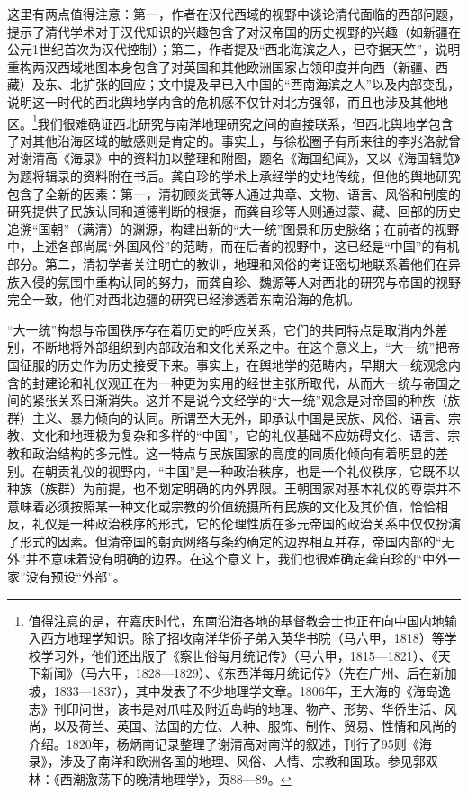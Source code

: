 \documentclass[a4paper, 12pt, openright]{ctexbook}
\begin{document}
这里有两点值得注意：第一，作者在汉代西域的视野中谈论清代面临的西部问题，提示了清代学术对于汉代知识的兴趣包含了对汉帝国的历史视野的兴趣（如新疆在公元1世纪首次为汉代控制）；第二，作者提及“西北海滨之人，已夺据天竺”，说明重构两汉西域地图本身包含了对英国和其他欧洲国家占领印度并向西（新疆、西藏）及东、北扩张的回应；文中提及早已入中国的“西南海滨之人”以及内部变乱，说明这一时代的西北舆地学内含的危机感不仅针对北方强邻，而且也涉及其他地区。\footnote{值得注意的是，在嘉庆时代，东南沿海各地的基督教会士也正在向中国内地输入西方地理学知识。除了招收南洋华侨子弟入英华书院（马六甲，1818）等学校学习外，他们还出版了《察世俗每月统记传》（马六甲，1815—1821）、《天下新闻》（马六甲，1828—1829）、《东西洋每月统记传》（先在广州、后在新加坡，1833—1837），其中发表了不少地理学文章。1806年，王大海的《海岛逸志》刊印问世，该书是对爪哇及附近岛屿的地理、物产、形势、华侨生活、风尚，以及荷兰、英国、法国的方位、人种、服饰、制作、贸易、性情和风尚的介绍。1820年，杨炳南记录整理了谢清高对南洋的叙述，刊行了95则《海录》，涉及了南洋和欧洲各国的地理、风俗、人情、宗教和国政。参见郭双林：《西潮激荡下的晚清地理学》，页88—89。}我们很难确证西北研究与南洋地理研究之间的直接联系，但西北舆地学包含了对其他沿海区域的敏感则是肯定的。事实上，与徐松圈子有所来往的李兆洛就曾对谢清高《海录》中的资料加以整理和附图，题名《海国纪闻》，又以《海国辑览》为题将辑录的资料附在书后。龚自珍的学术上承经学的史地传统，但他的舆地研究包含了全新的因素：第一，清初顾炎武等人通过典章、文物、语言、风俗和制度的研究提供了民族认同和道德判断的根据，而龚自珍等人则通过蒙、藏、回部的历史追溯“国朝”（满清）的渊源，构建出新的“大一统”图景和历史脉络；在前者的视野中，上述各部尚属“外国风俗”的范畴，而在后者的视野中，这已经是“中国”的有机部分。第二，清初学者关注明亡的教训，地理和风俗的考证密切地联系着他们在异族入侵的氛围中重构认同的努力，而龚自珍、魏源等人对西北的研究与帝国的视野完全一致，他们对西北边疆的研究已经渗透着东南沿海的危机。

“大一统”构想与帝国秩序存在着历史的呼应关系，它们的共同特点是取消内外差别，不断地将外部组织到内部政治和文化关系之中。在这个意义上，“大一统”把帝国征服的历史作为历史接受下来。事实上，在舆地学的范畴内，早期大一统观念内含的封建论和礼仪观正在为一种更为实用的经世主张所取代，从而大一统与帝国之间的紧张关系日渐消失。这并不是说今文经学的“大一统”观念是对帝国的种族（族群）主义、暴力倾向的认同。所谓至大无外，即承认中国是民族、风俗、语言、宗教、文化和地理极为复杂和多样的“中国”，它的礼仪基础不应妨碍文化、语言、宗教和政治结构的多元性。这一特点与民族国家的高度的同质化倾向有着明显的差别。在朝贡礼仪的视野内，“中国”是一种政治秩序，也是一个礼仪秩序，它既不以种族（族群）为前提，也不划定明确的内外界限。王朝国家对基本礼仪的尊崇并不意味着必须按照某一种文化或宗教的价值统摄所有民族的文化及其价值，恰恰相反，礼仪是一种政治秩序的形式，它的伦理性质在多元帝国的政治关系中仅仅扮演了形式的因素。但清帝国的朝贡网络与条约确定的边界相互并存，帝国内部的“无外”并不意味着没有明确的边界。在这个意义上，我们也很难确定龚自珍的“中外一家”没有预设“外部”。
\end{document}
